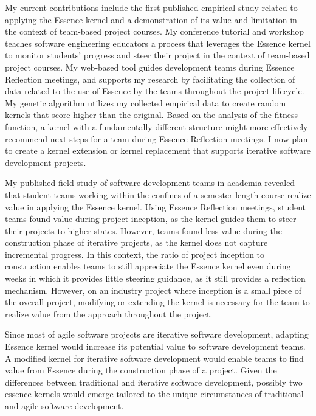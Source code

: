 \documentclass[preprint,12pt,3p]{elsarticle}
\begin{document}
My current contributions include the first published empirical study related to applying the Essence kernel and a demonstration of its value and limitation in the context of team-based project courses. My conference tutorial and workshop teaches software engineering educators a process that leverages the Essence kernel to monitor students' progress and steer their project in the context of team-based project courses. My web-based tool guides development teams during Essence Reflection meetings, and supports my research by facilitating the collection of data related to the use of Essence by the teams throughout the project lifecycle. My genetic algorithm utilizes my collected empirical data to create random kernels that score higher than the original. Based on the analysis of the fitness function, a kernel with a fundamentally different structure might more effectively recommend next steps for a team during Essence Reflection meetings. I now plan to create a kernel extension or kernel replacement that supports iterative software development projects.

My published field study of software development teams in academia revealed that student teams working within the confines of a semester length course realize value in applying the Essence kernel. Using Essence Reflection meetings, student teams found value during project inception, as the kernel guides them to steer their projects to higher states. However, teams found less value during the construction phase of iterative projects, as the kernel does not capture incremental progress. In this context, the ratio of project inception to construction enables teams to still appreciate the Essence kernel even during weeks in which it provides little steering guidance, as it still provides a reflection mechanism. However, on an industry project where inception is a small piece of the overall project, modifying or extending the kernel is necessary for the team to realize value from the approach throughout the project.

Since most of agile software projects are iterative software development, adapting Essence kernel would increase its potential value to software development teams. A modified kernel for iterative software development would enable teams to find value from Essence during the construction phase of a project. Given the differences between traditional and iterative software development, possibly two essence kernels would emerge tailored to the unique circumstances of traditional and agile software development.
\end{document}
